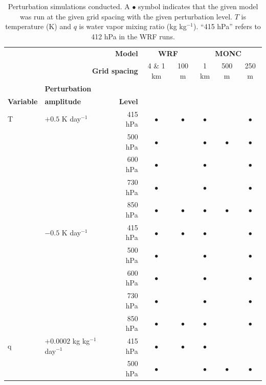 \documentclass[draft]{agujournal2019}
\begin{document}
{
\begin{table}[h]
    \centering
    \caption{Perturbation simulations conducted. A $\bullet{}$ symbol indicates 
    that the given model was run
    at the given grid spacing with the given perturbation level. $T$ is
    temperature (K) and $q$ is water vapor mixing ratio (kg kg$^{-1}$).
    ``415 hPa'' refers to 412 hPa in the WRF runs.}
    \label{tab:pert_runs}
    \renewcommand{\arraystretch}{0.6}
    \footnotesize
    \begin{tabular}{llr|cc|ccc}
        \multicolumn{3}{r|}{\textbf{Model}} & \multicolumn{2}{c|}{\textbf{WRF}} & \multicolumn{3}{c}{\textbf{MONC}} \\
        \multicolumn{3}{r|}{\textbf{Grid spacing}} & 4 \& 1 km & 100 m & 1 km & 500 m & 250 m \\
        \hline
        & \textbf{Perturbation} & & & & & & \\
        \textbf{Variable} & \textbf{amplitude} & \textbf{Level} & & & & & \\
        \hline
        T & $+0.5$ K day$^{-1}$ & 415 hPa & $\bullet{}$ & $\bullet{}$ & $\bullet{}$ &  & $\bullet{}$ \\
        & & 500 hPa & $\bullet{}$ & & $\bullet{}$ & $\bullet{}$ & $\bullet{}$ \\
        & & 600 hPa & $\bullet{}$ & & $\bullet{}$ &  & $\bullet{}$ \\
        & & 730 hPa & $\bullet{}$ & & $\bullet{}$ &  & $\bullet{}$ \\
        & & 850 hPa & $\bullet{}$ & $\bullet{}$ & $\bullet{}$ & $\bullet{}$ & $\bullet{}$ \\
        & $-0.5$ K day$^{-1}$ & 415 hPa & $\bullet{}$ & $\bullet{}$ & $\bullet{}$ &  & $\bullet{}$ \\
        & & 500 hPa & $\bullet{}$ & & $\bullet{}$ &  & $\bullet{}$\\
        & & 600 hPa & $\bullet{}$ & & $\bullet{}$ &  & $\bullet{}$ \\
        & & 730 hPa & $\bullet{}$ & & $\bullet{}$ &  & $\bullet{}$ \\
        & & 850 hPa & $\bullet{}$ & $\bullet{}$ & $\bullet{}$ &  & $\bullet{}$ \\
        \hline
        q & $+0.0002$ kg kg$^{-1}$ day$^{-1}$ & 415 hPa & $\bullet{}$ & $\bullet{}$ & $\bullet{}$ &  &  \\
        & & 500 hPa & $\bullet{}$ & & $\bullet{}$ & $\bullet{}$ & $\bullet{}$ \\

\end{tabular}
\end{table}}
\end{document}
